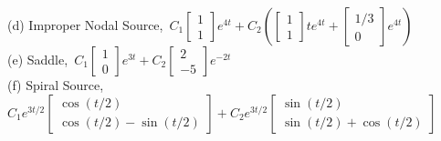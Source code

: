 {(d) Improper Nodal Source,\ $C_1\left[\begin{smallmatrix} 1 \\ 1 \end{smallmatrix}\right]e^{4t} + C_2\left(\left[\begin{smallmatrix} 1 \\ 1  \end{smallmatrix}\right]te^{4t} + \left[\begin{smallmatrix} 1/3 \\ 0 \end{smallmatrix}\right]e^{4t}\right)$ \hfill{}\hfill\hfill\\
(e) Saddle,\ $C_1\left[\begin{smallmatrix} 1 \\ 0 \end{smallmatrix}\right]e^{3t} + C_2\left[\begin{smallmatrix} 2 \\ -5 \end{smallmatrix}\right]e^{-2t}$ \hfill{}\hfill\hfill\\
(f) Spiral Source,\ $C_1e^{3t/2}\left[\begin{smallmatrix} \cos(t/2) \\ \cos(t/2) - \sin(t/2) \end{smallmatrix}\right] + C_2e^{3t/2}\left[\begin{smallmatrix} \sin(t/2) \\ \sin(t/2) + \cos(t/2) \end{smallmatrix}\right]$ \hfill{}\hfill\hfill\\
}
